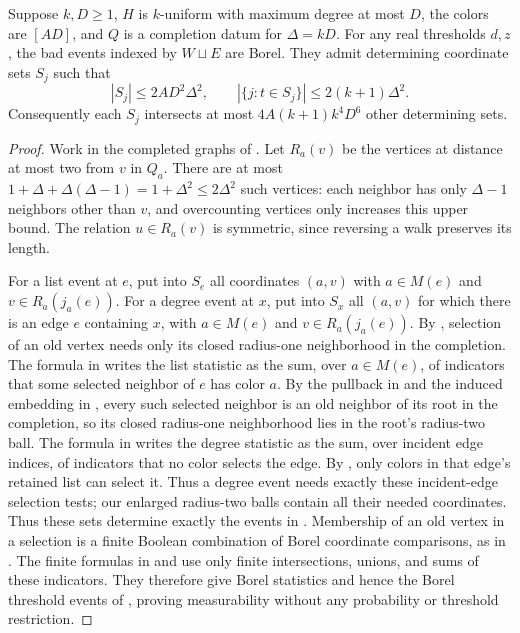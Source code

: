 \begin{lemma}
Suppose $k,D\ge1$, $H$ is $k$-uniform with maximum degree at most $D$,
the colors are $[AD]$, and $Q$ is a completion datum for $\Delta=kD$.
For any real thresholds $d,z$, the bad events indexed by $W\sqcup E$
are Borel. They admit determining coordinate sets $S_j$ such that
\[
|S_j|\le2AD^2\Delta^2,\qquad
|\{j:t\in S_j\}|\le2(k+1)\Delta^2.
\]
Consequently each $S_j$ intersects at most
$4A(k+1)k^4D^6$ other determining sets.
\end{lemma}
\begin{proof}
Work in the completed graphs of . Let
$R_a(v)$ be the vertices at distance at most two from $v$ in $Q_a$.
There are at most $1+\Delta+\Delta(\Delta-1)=1+\Delta^2\le2\Delta^2$
such vertices: each neighbor has only $\Delta-1$ neighbors other than
$v$, and overcounting vertices only increases this upper bound.
The relation $u\in R_a(v)$ is symmetric, since reversing a walk preserves
its length.

For a list event at $e$, put into $S_e$ all coordinates $(a,v)$ with
$a\in M(e)$ and $v\in R_a(j_a(e))$.
For a degree event at $x$, put into $S_x$ all $(a,v)$ for which there is
an edge $e$ containing $x$, with $a\in M(e)$ and
$v\in R_a(j_a(e))$.
By , selection of an old vertex needs
only its closed radius-one neighborhood in the completion.
The formula in  writes the list statistic as
the sum, over $a\in M(e)$, of indicators that some selected neighbor of
$e$ has color $a$. By the pullback in  and
the induced embedding in , every such
selected neighbor is an old neighbor of
its root in the completion, so its closed radius-one neighborhood lies
in the root's radius-two ball. The formula in 
writes the degree statistic as the sum, over incident edge indices, of
indicators that no color selects the edge. By ,
only colors in that edge's retained list can select it. Thus a degree event
needs exactly these incident-edge selection tests; our enlarged radius-two
balls contain all their needed coordinates.
Thus these sets determine exactly the events in .
Membership of an old vertex in a selection is a finite Boolean combination
of Borel coordinate comparisons, as in .
The finite formulas in  and
 use only finite intersections, unions, and
sums of these indicators. They therefore give Borel statistics and hence
the Borel threshold events of , proving measurability
without any probability or threshold restriction.


\end{proof}
